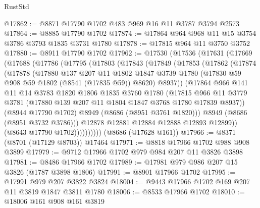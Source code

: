 \begin{lexlean}{RustStd}
\begin{coremodule}
@17862 := @8871 @17790 @1702 @483 @969 @16 @11 @3787 @3794 @2573
@17864 := @8885 @17790 @1702
@17874 := @17864 @964 @968 @11 @15 @3754 @3786 @3793 @1835 @3731 @1780
@17878 := @17815 @964 @11 @3750 @3752
@17880 := @8911 @17790 @1702
@17962 := @17530
    (@17536
      (@17631
        (@17669
          (@17688
            (@17786
              (@17795
                (@17803
                  (@17843
                    (@17849
                      (@17853
                        (@17862
                          (@17874
                            (@17878
                              (@17880
                                @137
                                @207
                                @11
                                @1802
                                @1847
                                @3739
                                @1780
                                (@17830 @59 @908 @59 @1802 (@8541 (@17835 @59)) @8620)
                                @8937))
                            (@17864
                              @966
                              @141
                              @11
                              @14
                              @3783
                              @1820
                              @1806
                              @1835
                              @3760
                              @1780
                              (@17815
                                @966
                                @11
                                @3779
                                @3781
                                (@17880 @139 @207 @11 @1804 @1847 @3768 @1780 @17839 @8937))
                              (@8944 @17790 @1702)
                              @8949
                              (@8686 (@8951 @3761 @1820)))
                            @8949
                            (@8686 (@8951 @3732 @3786)))
                          @12878
                          @12881
                          @12884
                          @12888
                          @12893
                          @12899))
                      (@8643 @17790 @1702))))))))))
    (@8686 (@17628 @161))
@17966 := @8371 (@8701 (@17129 @8703)) @17464
@17971 := @8818 @17966 @1702 @988 @908 @3899
@17979 := @9712 @17966 @1702 @979 @984 @207 @11 @3826 @3898
@17981 := @8486 @17966 @1702
@17989 := @17981 @979 @986 @207 @15 @3826 (@1787 @3898 @1806)
@17991 := @8901 @17966 @1702
@17995 := @17991 @979 @207 @3822 @3824
@18004 := @9443 @17966 @1702 @169 @207 @11 @3819 @1847 @3811 @1780
@18006 := @8533 @17966 @1702
@18010 := @18006 @161 @908 @161 @3819

\end{coremodule}
\end{lexlean}
